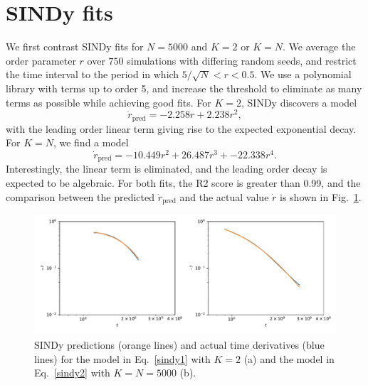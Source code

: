 \documentclass[aps,pre,amsmath,amssymb,floatfix,onecolumn,notitlepage,10pt]{revtex4-1}
\begin{document}
\section{SINDy fits}
We first contrast SINDy fits for $N=5000$ and $K=2$ or $K=N$. We average the order parameter $r$ over $750$ simulations with differing random seeds, and restrict the time interval to the period in which $5/\sqrt{N}<r<0.5$.  We use a polynomial library with terms up to order 5, and increase the threshold to eliminate as many terms as possible while achieving good fits. For $K=2$, SINDy discovers a model
\begin{equation}
\dot{r}_{\mathrm{pred}} = -2.258 r + 2.238 r^2,\label{sindy1}
\end{equation}
with the leading order linear term giving rise to the expected exponential decay. For $K=N$, we find a model
\begin{equation}
\dot{r}_{\mathrm{pred}} = -10.449 r^2 + 26.487 r^3 + -22.338 r^4.\label{sindy2}
\end{equation}
Interestingly,  the linear term is eliminated, and the leading order decay is expected to be algebraic. For both fits, the R2 score is greater than 0.99, and the comparison between the predicted $\dot{r}_{\mathrm{pred}}$ and the actual value $\dot{r}$ is shown in Fig.~\ref{fig2}.
\begin{figure}[hbt]
\includegraphics[width=0.75\columnwidth]{fig2}
\caption{SINDy predictions (orange lines) and actual time derivatives (blue lines) for the model in Eq.~\eqref{sindy1} with $K=2$ (a) and the model in Eq.~\eqref{sindy2} with $K=N=5000$ (b). \label{fig2}}
\end{figure}
\end{document}
